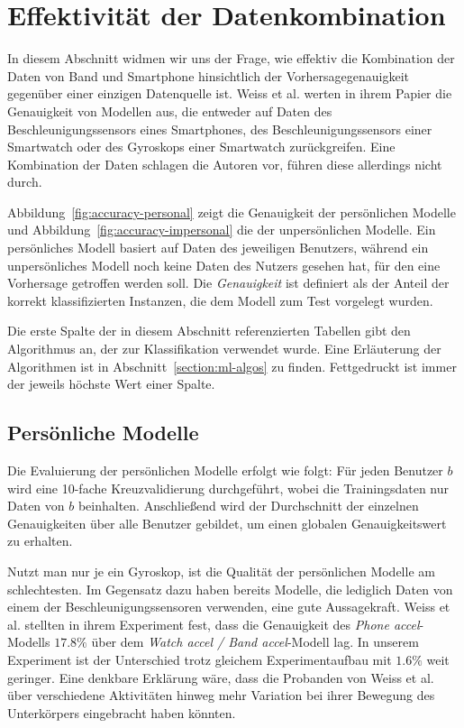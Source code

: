 
\section{Effektivität der Datenkombination}
In diesem Abschnitt widmen wir uns der Frage, wie effektiv die Kombination der Daten von Band und Smartphone hinsichtlich der Vorhersagegenauigkeit gegenüber einer einzigen Datenquelle ist. Weiss et al.\cite{Weiss2016} werten in ihrem Papier die Genauigkeit von Modellen aus, die entweder auf Daten des Beschleunigungssensors eines Smartphones, des Beschleunigungssensors einer Smartwatch oder des Gyroskops einer Smartwatch zurückgreifen. Eine Kombination der Daten schlagen die Autoren vor, führen diese allerdings nicht durch.

Abbildung~\ref{fig:accuracy-personal} zeigt die Genauigkeit der persönlichen Modelle und Abbildung~\ref{fig:accuracy-impersonal} die der unpersönlichen Modelle. Ein persönliches Modell basiert auf Daten des jeweiligen Benutzers, während ein unpersönliches Modell noch keine Daten des Nutzers gesehen hat, für den eine Vorhersage getroffen werden soll. Die \textit{Genauigkeit} ist definiert als der Anteil der korrekt klassifizierten Instanzen, die dem Modell zum Test vorgelegt wurden.

Die erste Spalte der in diesem Abschnitt referenzierten Tabellen gibt den Algorithmus an, der zur Klassifikation verwendet wurde. Eine Erläuterung der Algorithmen ist in Abschnitt~\ref*{section:ml-algos}
zu finden. Fettgedruckt ist immer der jeweils höchste Wert einer Spalte.

\subsection{Persönliche Modelle}

Die Evaluierung der persönlichen Modelle erfolgt wie folgt: Für jeden Benutzer $b$ wird eine 10-fache Kreuzvalidierung  durchgeführt, wobei die Trainingsdaten nur Daten von $b$ beinhalten. Anschließend wird der Durchschnitt der einzelnen Genauigkeiten über alle Benutzer gebildet, um einen globalen Genauigkeitswert zu erhalten.

Nutzt man nur je ein Gyroskop, ist die Qualität der persönlichen Modelle am schlechtesten. Im Gegensatz dazu haben bereits Modelle, die lediglich Daten von einem der Beschleunigungssensoren verwenden, eine gute Aussagekraft. Weiss et al.\cite{Weiss2016} stellten in ihrem Experiment fest, dass die Genauigkeit des \textit{Phone accel}-Modells $17.8 \%$ über dem \textit{Watch accel / Band accel}-Modell lag. In unserem Experiment ist der Unterschied trotz gleichem Experimentaufbau mit $1.6 \%$ weit geringer. Eine denkbare Erklärung wäre, dass die Probanden von Weiss et al. über verschiedene Aktivitäten hinweg mehr Variation bei ihrer Bewegung des Unterkörpers eingebracht haben könnten.

